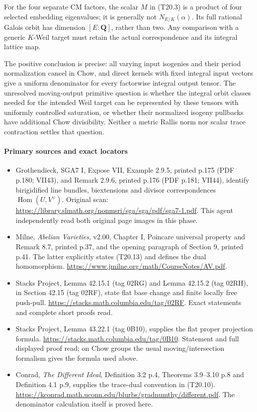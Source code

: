 For the four separate CM factors, the scalar \(M\) in (T20.3) is a product of four selected embedding eigenvalues; it is generally not \(N_{E/K}(\alpha)\). Its full rational Galois orbit has dimension \([E:\mathbf Q]\), rather than two. Any comparison with a generic \(K\)-Weil target must retain the actual correspondence and its integral lattice map.

The positive conclusion is precise: all varying input isogenies and their period normalization cancel in Chow, and direct kernels with fixed integral input vectors give a uniform denominator for every factorwise integral output tensor. The unresolved moving-output primitive question is whether the integral orbit classes needed for the intended Weil target can be represented by these tensors with uniformly controlled saturation, or whether their normalized isogeny pullbacks have additional Chow divisibility. Neither a metric Rallis norm nor scalar trace contraction settles that question.

\paragraph{Primary sources and exact locators}\label{primary-sources-and-exact-locators}

\begin{itemize}
\tightlist
\item
  Grothendieck, SGA7 I, Expose VII, Example 2.9.5, printed p.175 (PDF p.180; VII43), and Remark 2.9.6, printed p.176 (PDF p.181; VII44), identify birigidified line bundles, biextensions and divisor correspondences \(\operatorname{Hom}(U,V^\vee)\). Original scan: \url{https://library.slmath.org/nonmsri/sga/sga/pdf/sga7-1.pdf}. This agent independently read both original page images in this phase.
\item
  Milne, \emph{Abelian Varieties}, v2.00, Chapter I, Poincare universal property and Remark 8.7, printed p.37, and the opening paragraph of Section 9, printed p.41. The latter explicitly states (T20.13) and defines the dual homomorphism. \url{https://www.jmilne.org/math/CourseNotes/AV.pdf}.
\item
  Stacks Project, Lemma 42.15.1 (tag 02RG) and Lemma 42.15.2 (tag 02RH), in Section 42.15 (tag 02RF), state flat base change and finite locally free push-pull. \url{https://stacks.math.columbia.edu/tag/02RF}. Exact statements and complete short proofs read.
\item
  Stacks Project, Lemma 43.22.1 (tag 0B10), supplies the flat proper projection formula. \url{https://stacks.math.columbia.edu/tag/0B10}. Statement and full displayed proof read; on Chow groups the usual moving/intersection formalism gives the formula used above.
\item
  Conrad, \emph{The Different Ideal}, Definition 3.2 p.4, Theorems 3.9--3.10 p.8 and Definition 4.1 p.9, supplies the trace-dual convention in (T20.10). \url{https://kconrad.math.uconn.edu/blurbs/gradnumthy/different.pdf}. The denominator calculation itself is proved here.
\end{itemize}

